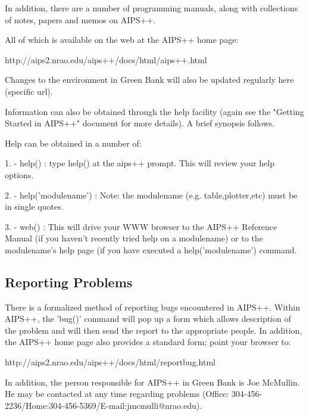 In addition, there are a number of programming manuals, along with
collections of notes, papers and memos on AIPS++.
 
All of which is available on the web at the AIPS++ home page:
 
http://aips2.nrao.edu/aips++/docs/html/aips++.html

Changes to the environment in Green Bank will also be updated regularly
here (specific url).
 
Information can also be obtained through the help facility (again see the
"Getting Started in AIPS++" document for more details). A brief synopsis
follows.

Help can be obtained in a number of:
\begin{description}
\item{1.} - help() : type help() at the aips++ prompt. This will review your
	help options. 
\item{2.} - help('modulename') : Note: the modulename (e.g. table,plotter,etc)
		must be in single quotes.
\item{3.} - web() : This will drive your WWW browser to the AIPS++ Reference
	Manual (if you haven't recently tried help on a modulename) or to
	the modulename's help page (if you have executed a help('modulename')
	command.
\end{description}

\subsection{Reporting Problems}

There is a formalized method of reporting bugs encountered in AIPS++. 
Within AIPS++, the 'bug()' command will pop up a form which allows
description of the problem and will then send the report to the appropriate
people. In addition, the AIPS++ home page also provides a standard form;
point your browser to:

http://aips2.nrao.edu/aips++/docs/html/reportbug.html

In addition, the person responsible for AIPS++ in Green Bank is Joe McMullin.
He may be contacted at any time regarding problems (Office: 
304-456-2236/Home:304-456-5369/E-mail:jmcmulli@nrao.edu).


